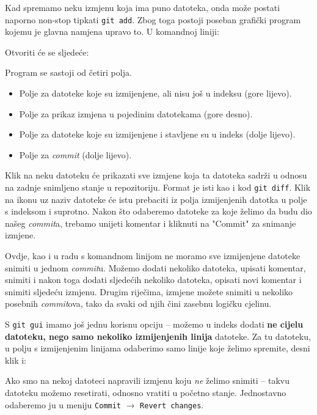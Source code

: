 Kad spremamo neku izmjenu koja ima puno datoteka, onda može postati naporno non-stop tipkati \verb+git add+.
Zbog toga postoji poseban grafički program kojemu je glavna namjena upravo to.
U komandnoj liniji:


Otvoriti će se sljedeće:


Program se sastoji od četiri polja. 

\begin{itemize}
	\item Polje za datoteke koje su izmijenjene, ali nisu još u indeksu (gore lijevo).
	\item Polje za prikaz izmjena u pojedinim datotekama (gore desno). 
	\item Polje za datoteke koje su izmijenjene i stavljene su u indeks (dolje lijevo).
	\item Polje za \emph{commit} (dolje lijevo).
\end{itemize}

Klik na neku datoteku će prikazati sve izmjene koja ta datoteka sadrži u odnosu na zadnje snimljeno stanje u repozitoriju.
Format je isti kao i kod \verb+git diff+.
Klik na ikonu uz naziv datoteke će istu prebaciti iz polja izmijenjenih datotka u polje s indeksom i suprotno.
Nakon što odaberemo datoteke za koje želimo da budu dio našeg \emph{commit}a, trebamo unijeti komentar i kliknuti na "Commit" za snimanje izmjene.

Ovdje, kao i u radu s komandnom linijom ne moramo sve izmijenjene datoteke snimiti u jednom \emph{commit}u. 
Možemo dodati nekoliko datoteka, upisati komentar, snimiti i nakon toga dodati sljedećih nekoliko datoteka, opisati novi komentar i snimiti sljedeću izmjenu.
Drugim riječima, izmjene možete snimiti u nekoliko posebnih \emph{commit}ova, tako da svaki od njih čini zasebnu logičku cjelinu.

S \verb+git gui+ imamo još jednu korisnu opciju -- možemo u indeks dodati \textbf{ne cijelu datoteku, nego samo nekoliko izmijenjenih linija} datoteke.
Za tu datoteku, u polju s izmijenjenim linijama odaberimo samo linije koje želimo spremite, desni klik i:


Ako smo na nekoj datoteci napravili izmjenu koju \emph{ne} želimo snimiti -- takvu datoteku možemo resetirati, odnosno vratiti u početno stanje. 
Jednostavno odaberemo ju u meniju \verb+Commit+ $\rightarrow$ \verb+Revert changes+.


